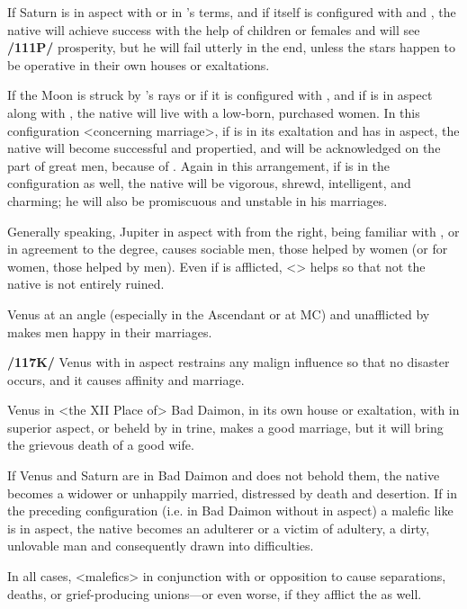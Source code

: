 If Saturn is in aspect with \Venus\xspace or in \Venus’s terms, and if \Venus\xspace itself is configured with \Jupiter\xspace and \Mars, the native will achieve success with the help of children or females and will see \textbf{/111P/} prosperity, but  he will fail utterly in the end, unless the stars happen to be operative in their own houses or
exaltations. 

If the Moon is struck by \Jupiter’s rays or if it is configured with \Jupiter, and if \Saturn\xspace is in aspect along with \Jupiter, the native will live with a low-born, purchased women. In this configuration <concerning marriage>, if \Venus\xspace is in its exaltation and has \Jupiter\xspace in aspect, the native will become successful and propertied, and will be acknowledged on the part of great men, because of \Venus. Again in this arrangement, if \Mercury\xspace is in the configuration as well, the native will be vigorous, shrewd, intelligent, and charming; he will also be promiscuous and unstable in his marriages. 

Generally speaking, Jupiter in aspect with \Venus\xspace from the right, being familiar with \Venus, or in agreement to the degree, causes sociable men, those helped by women (or for women, those helped by men). Even if \Venus\xspace is afflicted, <\Jupiter> helps so that not the native is not entirely ruined.

Venus at an angle (especially in the Ascendant or at MC) and unafflicted by \Saturn\xspace makes men happy
in their marriages. 

\textbf{/117K/} Venus with \Jupiter\xspace in aspect restrains any malign influence so that no disaster occurs, and it causes affinity and marriage. 

Venus in <the XII Place of> Bad Daimon, in its own house or exaltation, with \Jupiter\xspace in superior aspect, or beheld by \Jupiter\xspace in trine, makes a good marriage, but it will bring the grievous death of a good wife. 

If Venus and Saturn are in Bad Daimon and \Jupiter\xspace does not behold them, the native becomes a widower or unhappily married, distressed by death and desertion. If in the preceding configuration (i.e. \Venus\xspace in Bad Daimon without \Jupiter\xspace in aspect) a malefic like \Mars\xspace is in aspect, the native becomes an adulterer or a victim of adultery, a dirty, unlovable man and consequently drawn into difficulties. 

In all cases, <malefics> in conjunction with or opposition to \Venus\xspace cause separations, deaths, or grief-producing unions—or even worse, if they afflict the \Moon\xspace as well.

